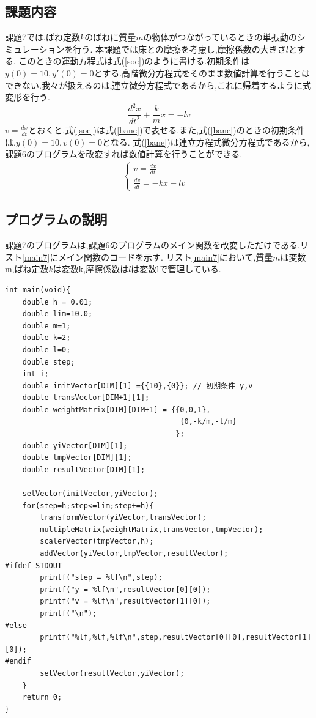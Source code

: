 \documentclass[a4j]{jarticle}
\begin{document}
      \subsection{課題内容}
      課題7では,ばね定数$k$のばねに質量$m$の物体がつながっているときの単振動のシミュレーションを行う.
      本課題では床との摩擦を考慮し,摩擦係数の大きさ$l$とする.
      このときの運動方程式は式(\ref{soe})のように書ける.初期条件は$y(0)=10,y'(0)=0$とする.高階微分方程式をそのまま数値計算を行うことは
      できない.我々が扱えるのは,連立微分方程式であるから,これに帰着するように式変形を行う.
      \begin{equation}
        \frac{d^2x}{dt^2}+\frac{k}{m}x=-lv
        \label{soe}
      \end{equation}
      $v=\frac{dx}{dt}$とおくと,式(\ref{soe})は式(\ref{bane})で表せる.また,式(\ref{bane})のときの初期条件は,$y(0)=10,v(0)=0$となる.
      式(\ref{bane})は連立方程式微分方程式であるから,課題6のプログラムを改変すれば数値計算を行うことができる.
      \begin{eqnarray}
        \begin{cases}
          v = \frac{dx}{dt} & \\
          \frac{dv}{dt} = -kx-lv &
        \end{cases}
        \label{bane}
      \end{eqnarray}


      \subsection{プログラムの説明}
      課題7のプログラムは,課題6のプログラムのメイン関数を改変しただけである.リスト\ref{main7}にメイン関数のコードを示す.
      リスト\ref{main7}において,質量$m$は変数m,ばね定数$k$は変数k,摩擦係数は$l$は変数lで管理している.
      \begin{lstlisting}[basicstyle=\ttfamily\footnotesize, frame=single,label=main7,caption=メイン関数のコード]
int main(void){
    double h = 0.01;
    double lim=10.0;
    double m=1;
    double k=2;
    double l=0;
    double step;
    int i;
    double initVector[DIM][1] ={{10},{0}}; // 初期条件 y,v 
    double transVector[DIM+1][1];
    double weightMatrix[DIM][DIM+1] = {{0,0,1},
                                        {0,-k/m,-l/m}
                                       };
    double yiVector[DIM][1];
    double tmpVector[DIM][1];
    double resultVector[DIM][1];

    setVector(initVector,yiVector);
    for(step=h;step<=lim;step+=h){
        transformVector(yiVector,transVector);
        multipleMatrix(weightMatrix,transVector,tmpVector);
        scalerVector(tmpVector,h);
        addVector(yiVector,tmpVector,resultVector);
#ifdef STDOUT
        printf("step = %lf\n",step);
        printf("y = %lf\n",resultVector[0][0]);
        printf("v = %lf\n",resultVector[1][0]);
        printf("\n");
#else
        printf("%lf,%lf,%lf\n",step,resultVector[0][0],resultVector[1][0]);
#endif
        setVector(resultVector,yiVector);
    }
    return 0;
}
            \end{lstlisting}     
\end{document}
